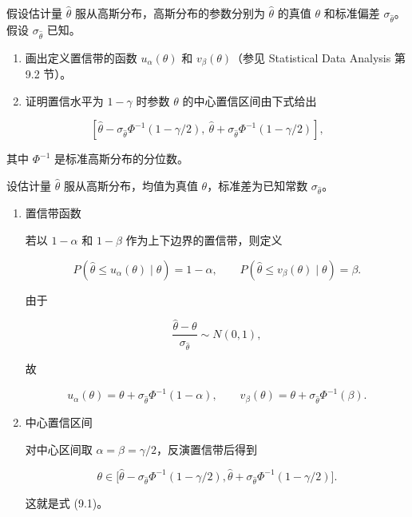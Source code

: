 ﻿


\begin{question}
假设估计量 \(\hat\theta\) 服从高斯分布，高斯分布的参数分别为
\(\hat\theta\) 的真值 \(\theta\) 和标准偏差
\(\sigma_{\hat\theta}\)。假设 \(\sigma_{\hat\theta}\) 已知。

\begin{enumerate}
\item
  画出定义置信带的函数 \(u_\alpha(\theta)\) 和 \(v_\beta(\theta)\)（参见
  Statistical Data Analysis 第 9.2 节）。
\item
  证明置信水平为 \(1-\gamma\) 时参数 \(\theta\) 的中心置信区间由下式给出
\end{enumerate}

\[
\left[\hat\theta-\sigma_{\hat\theta}\Phi^{-1}(1-\gamma/2),\ \hat\theta+\sigma_{\hat\theta}\Phi^{-1}(1-\gamma/2)\right],
\]

其中 \(\Phi^{-1}\) 是标准高斯分布的分位数。
\begin{solution}
设估计量 \(\hat\theta\) 服从高斯分布，均值为真值
\(\theta\)，标准差为已知常数 \(\sigma_{\hat\theta}\)。

\begin{enumerate}
\item 置信带函数

若以 \(1-\alpha\) 和 \(1-\beta\) 作为上下边界的置信带，则定义

\[
P(\hat\theta\le u_\alpha(\theta)\mid \theta)=1-\alpha,
\qquad
P(\hat\theta\le v_\beta(\theta)\mid \theta)=\beta.
\]

由于

\[
\frac{\hat\theta-\theta}{\sigma_{\hat\theta}}\sim N(0,1),
\]

故

\[
u_\alpha(\theta)=\theta+\sigma_{\hat\theta}\Phi^{-1}(1-\alpha),
\qquad
v_\beta(\theta)=\theta+\sigma_{\hat\theta}\Phi^{-1}(\beta).
\]

\item 中心置信区间

对中心区间取 \(\alpha=\beta=\gamma/2\)，反演置信带后得到

\[
\theta\in
\Big[
\hat\theta-\sigma_{\hat\theta}\Phi^{-1}(1-\gamma/2),
\hat\theta+\sigma_{\hat\theta}\Phi^{-1}(1-\gamma/2)
\Big].
\]

这就是式 (9.1)。
\end{enumerate}
\end{solution}
\end{question}


